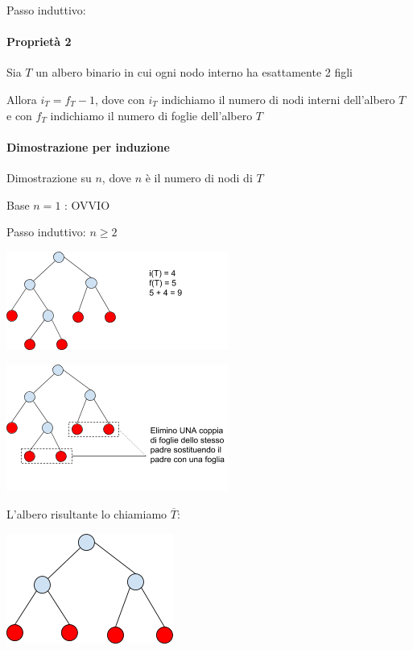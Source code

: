 {{{{Passo induttivo:}



\paragraph{Proprietà 2}

{Sia $T$ un albero binario in cui ogni nodo interno ha esattamente 2 figli}

{Allora $i_T=f_T-1$, dove con $i_T$ indichiamo il numero di nodi interni dell'albero $T$ e con $f_T$ indichiamo il numero di foglie dell'albero $T$}

\paragraph{Dimostrazione per induzione}

{Dimostrazione su $n$, dove $n$ è il numero di nodi di $T$}

{Base $n=1$ : OVVIO}

{Passo induttivo: $n \geq 2$}

{\includegraphics{images/image525.png}}

{\includegraphics{images/image536.png}}

{L'albero risultante lo chiamiamo $\overline{T}$:}

{\includegraphics{images/image522.png}}

}}}
